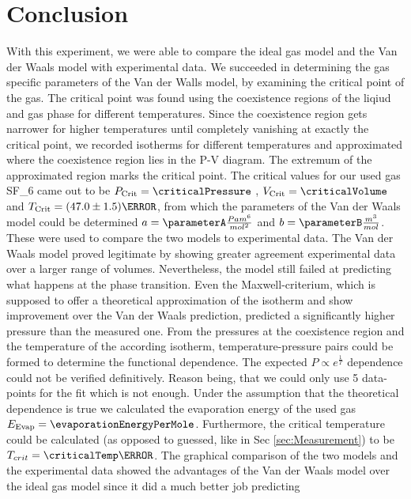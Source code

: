 \documentclass[a4paper,10pt,twocolumn]{article}
\begin{document}
    
    \section[]{Conclusion}\label{sec:conclusion}
    With this experiment, we were able to compare the ideal gas model and the Van der Waals model with experimental data.
    We succeeded in determining the gas specific parameters of the Van der Walls model, by examining the critical point of the gas.
    The critical point was found using the coexistence regions of the liqiud and gas phase for different temperatures. 
    Since the coexistence region gets narrower for higher temperatures until completely vanishing at exactly the critical point, we recorded isotherms for different temperatures
    and approximated where the coexistence region lies in the P-V diagram.
    The extremum of the approximated region marks the critical point.
    The critical values for our used gas SF_6\) came out to be $P_{\text{Crit}}=\criticalPressure$ , $V_{\text{Crit}}=\criticalVolume$ and $T_{\text{Crit}}=(47.0\pm 1.5)\degree$, from which the parameters of the Van der Waals model could be determined
    $a=\parameterA \frac{Pa m^6}{mol^2} $ and $b=\parameterB \frac{m^3}{mol} $.
    These were used to compare the two models to experimental data.
    The Van der Waals model proved legitimate by showing greater agreement experimental data over a larger range of volumes.
    Nevertheless, the model still failed at predicting what happens at the phase transition.
    Even the Maxwell-criterium, which is supposed to offer a theoretical approximation of the isotherm and show improvement over the Van der Waals prediction,
    predicted a significantly higher pressure than the measured one.
    From the pressures at the coexistence region and the temperature of the according isotherm, temperature-pressure pairs could be formed to determine the functional dependence.
    The expected $P \propto e^{\frac{1}{T}} $ dependence could not be verified definitively.
    Reason being, that we could only use 5 data-points for the fit which is not enough.
    Under the assumption that the theoretical dependence is true we calculated the evaporation energy of the used gas $E_{\text{Evap}} =\evaporationEnergyPerMole $.
    Furthermore, the critical temperature could be calculated (as opposed to guessed, like in Sec \ref{sec:Measurement}) to be $T_{crit}=\criticalTemp \degree$.
    The graphical comparison of the two models and the experimental data showed the advantages of the Van der Waals model over the ideal gas model since it did a much better job predicting
\end{document}
